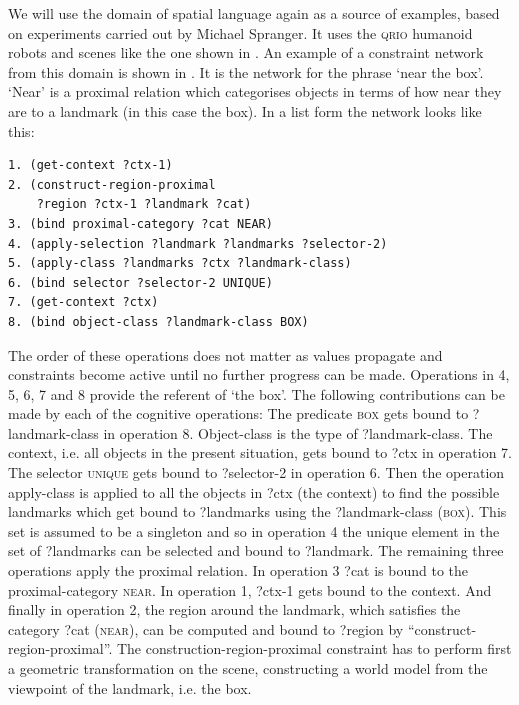 We will use the domain of spatial language again as a source of examples, based on experiments carried out by 
Michael Spranger. It uses the \textsc{qrio} humanoid robots 
and scenes like the one shown in . An example of a constraint network from this domain 
is shown in . It is the network for the phrase `near the box'. `Near' is a proximal 
relation which categorises objects in terms of how near they are to a landmark (in this case the box). In a list form the 
network looks like this: 
\begin{small}
\begin{verbatim}
1. (get-context ?ctx-1) 
2. (construct-region-proximal 
    ?region ?ctx-1 ?landmark ?cat) 
3. (bind proximal-category ?cat NEAR) 
4. (apply-selection ?landmark ?landmarks ?selector-2)
5. (apply-class ?landmarks ?ctx ?landmark-class) 
6. (bind selector ?selector-2 UNIQUE) 
7. (get-context ?ctx) 
8. (bind object-class ?landmark-class BOX)
\end{verbatim}
\end{small}
The order of these operations does not matter as values propagate and constraints become active until no further progress
can be made. Operations in 4, 5, 6, 7 and 8 provide the referent of `the box'. The following contributions 
can be made by each of the cognitive operations: The predicate \textsc{box} gets bound to ?landmark-class in operation 8. Object-class is 
the type of ?landmark-class. The context, i.e. all objects in the present situation, gets bound to ?ctx in operation 7. 
The selector \textsc{unique} gets bound to ?selector-2 in operation 6. 
Then the operation apply-class is applied to all the objects in ?ctx (the context) to find the possible landmarks which 
get bound to ?landmarks using the ?landmark-class (\textsc{box}). This set is assumed to be a singleton and so 
in operation 4 the unique element in the set of ?landmarks can be selected 
and bound to ?landmark. 
\enlargethispage{1\baselineskip}
The remaining three operations apply the proximal relation. In operation 3 ?cat is bound to the proximal-category \textsc{near}. 
In operation 1, ?ctx-1 gets bound to 
the context. And finally in operation 2, the region around the landmark, which satisfies the category ?cat (\textsc{near}), can 
be computed and bound to ?region by ``construct-region-proximal''. The construction-region-proximal constraint has to perform first 
a geometric transformation on the scene, constructing a world model from the viewpoint of the landmark, i.e. the box. 

